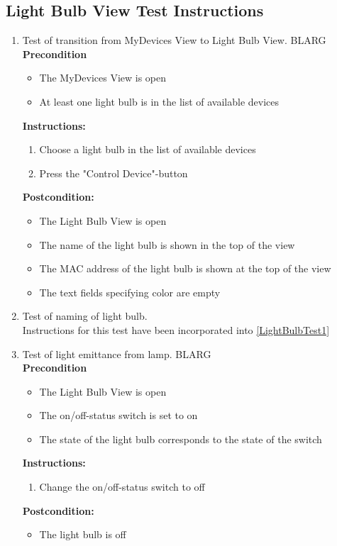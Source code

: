 \documentclass[a4paper]{article}
\newlength{\testlabellength}
\newenvironment{testlist}{\begin{enumerate}[label=\bfseries Instruction \thesubsection.\arabic* , labelindent=0pt, labelwidth=\testlabellength , leftmargin=2cm]}{\end{enumerate}}
\newenvironment{precondition}{
{\color{white}BLARG}\\ 
\textbf{Precondition}
\begin{itemize}[labelindent=0cm, labelwidth=2cm , leftmargin=1cm]
}
{\end{itemize}}
\newenvironment{instruction}{
\textbf{Instructions:}
\begin{enumerate}[label=\bfseries  \arabic*., labelindent=0cm, labelwidth=2cm , leftmargin=1cm]
}
{\end{enumerate}}
\newenvironment{postcondition}{
\textbf{Postcondition:}
\begin{itemize}[labelindent=0cm, labelwidth=2cm , leftmargin=1cm]
}
{\end{itemize}}
\begin{document}
\begin{appendices}
\subsection{Light Bulb View Test Instructions}
\begin{testlist}
    \item Test of transition from MyDevices View to Light Bulb View. \label{LightBulbTest1}
    	\begin{precondition}
    		\item The MyDevices View is open
    		\item At least one light bulb is in the list of available devices
    	\end{precondition}
    	\begin{instruction}
    		\item Choose a light bulb in the list of available devices
    		\item Press the "Control Device"-button
    	\end{instruction}
    	\begin{postcondition}
    		\item The Light Bulb View is open
    		\item The name of the light bulb is shown in the top of the view
    		\item The MAC address of the light bulb is shown at the top of the view
    		\item The text fields specifying color are empty
    	\end{postcondition}
	
	\item Test of naming of light bulb.\\
		Instructions for this test have been incorporated into \ref{LightBulbTest1}

	\item Test of light emittance from lamp.
		\begin{precondition}
			\item The Light Bulb View is open
			\item The on/off-status switch is set to on
			\item The state of the light bulb corresponds to the state of the switch
		\end{precondition}
    	\begin{instruction}
    		\item Change the on/off-status switch to off
    	\end{instruction}
    	\begin{postcondition}
    		\item The light bulb is off
    	\end{postcondition}  		
  

\end{testlist}
\end{appendices}
\end{document}
